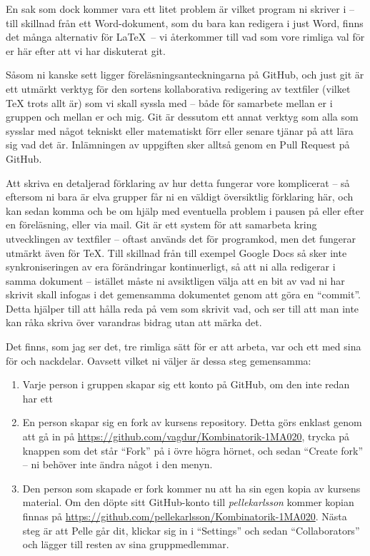 \documentclass{tufte-handout}
\begin{document}
En sak som dock kommer vara ett litet problem är vilket program ni skriver i -- till skillnad från ett Word-dokument, som du bara kan redigera i just Word, finns det många alternativ för \LaTeX\ -- vi återkommer till vad som vore rimliga val för er här efter att vi har diskuterat git.

Såsom ni kanske sett ligger föreläsningsanteckningarna på GitHub, och just git är ett utmärkt verktyg för den sortens kollaborativa redigering av textfiler (vilket TeX trots allt är) som vi skall syssla med -- både för samarbete mellan er i gruppen och mellan er och mig. Git är dessutom ett annat verktyg som alla som sysslar med något tekniskt eller matematiskt förr eller senare tjänar på att lära sig vad det är. Inlämningen av uppgiften sker alltså genom en Pull Request på GitHub.

Att skriva en detaljerad förklaring av hur detta fungerar vore komplicerat -- så eftersom ni bara är elva grupper får ni en väldigt översiktlig förklaring här, och kan sedan komma och be om hjälp med eventuella problem i pausen på eller efter en föreläsning, eller via mail. Git är ett system för att samarbeta kring utvecklingen av textfiler -- oftast används det för programkod, men det fungerar utmärkt även för TeX. Till skillnad från till exempel Google Docs så sker inte synkroniseringen av era förändringar kontinuerligt, så att ni alla redigerar i samma dokument -- istället måste ni avsiktligen välja att en bit av vad ni har skrivit skall infogas i det gemensamma dokumentet genom att göra en ``commit''. Detta hjälper till att hålla reda på vem som skrivit vad, och ser till att man inte kan råka skriva över varandras bidrag utan att märka det.

Det finns, som jag ser det, tre rimliga sätt för er att arbeta, var och ett med sina för och nackdelar. Oavsett vilket ni väljer är dessa steg gemensamma:
\begin{enumerate}
	\item Varje person i gruppen skapar sig ett konto på GitHub, om den inte redan har ett
	\item En person skapar sig en fork av kursens repository. Detta görs enklast genom att gå in på \url{https://github.com/vagdur/Kombinatorik-1MA020}, trycka på knappen som det står ``Fork'' på i övre högra hörnet, och sedan ``Create fork'' -- ni behöver inte ändra något i den menyn.
	\item Den person som skapade er fork kommer nu att ha sin egen kopia av kursens material. Om den döpte sitt GitHub-konto till \emph{pellekarlsson} kommer kopian finnas på \url{https://github.com/pellekarlsson/Kombinatorik-1MA020}. Nästa steg är att Pelle går dit, klickar sig in i ``Settings'' och sedan ``Collaborators'' och lägger till resten av sina gruppmedlemmar. 
\end{enumerate}
\end{document}
